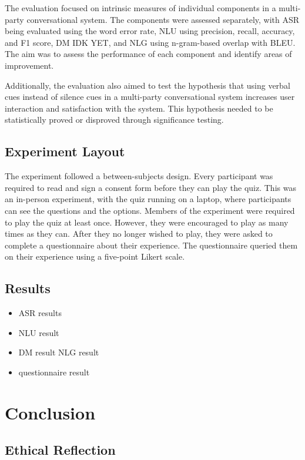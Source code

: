 \documentclass[hidelinks, 11pt]{article}
\begin{document}
The evaluation focused on intrinsic measures of individual components in a multi-party conversational system. The components were assessed separately, with ASR being evaluated using the word error rate, NLU using precision, recall, accuracy, and F1 score, DM IDK YET, and NLG using n-gram-based overlap with BLEU. The aim was to assess the performance of each component and identify areas of improvement.

Additionally, the evaluation also aimed to test the hypothesis that using verbal cues instead of silence cues in a multi-party conversational system increases user interaction and satisfaction with the system. This hypothesis needed to be statistically proved or disproved through significance testing.
\subsection{Experiment Layout}
\label{subsec:experiment_layout}
The experiment followed a between-subjects design. Every participant was required to read and sign a consent form before they can play the quiz. This was an in-person experiment, with the quiz running on a laptop, where participants can see the questions and the options. Members of the experiment were required to play the quiz at least once. However, they were encouraged to play as many times as they can. After they no longer wished to play, they were asked to complete a questionnaire about their experience. The questionnaire queried them on their experience using a five-point Likert scale.

\subsection{Results}
\label{subsec:results}

\begin{itemize}
  \item ASR results
  \item NLU result
  \item DM result
        NLG result
  \item questionnaire result
\end{itemize}

\section{Conclusion}
\label{sec:conclusion}

\subsection{Ethical Reflection}
\label{subsec:ethics}
\end{document}
